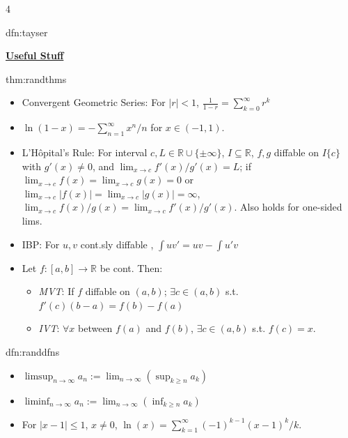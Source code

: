 \documentclass[landscape, 8pt]{extarticle}
\begin{document}
\begin{multicols*}{4}
\begin{dfn}{dfn:tayser}{ }
		\end{dfn}
		
		
		
	\columnbreak
	\vspace*{-8pt}
		
		
		{\footnotesize \textbf{\underline{Useful Stuff}}}
		
		
		
		\begin{thm}{thm:randthms}{ }
		\begin{itemize}
			\item Convergent Geometric Series: For $\left|r\right| < 1$, $\frac{1}{1-r} = \sum_{k=0}^{\infty}r^k$
			\item $\ln(1-x) = - \sum_{n=1}^{\infty} x^n/n$ for $x\in (-1, 1)$.
			\item L'H\^opital's Rule: For interval $c, L\in \mathbb{R} \cup \{\pm \infty\}$, $I \subseteq \mathbb{R}$, $f, g$ diffable on $I\{c\}$ with $g'(x) \ne 0$, and $\lim_{x\to c} f'(x)/g'(x) = L$; if $\lim_{x\to c}f(x) = \lim_{x\to c} g(x) = 0$ or $\lim_{x\to c}\left|f(x)\right| = \lim_{x\to c} \left|g(x)\right| = \infty$, $\lim_{x\to c} f(x)/g(x) = \lim_{x\to c} f'(x)/g'(x)$. Also holds for one-sided lims.
			\item IBP: For $u, v$ cont.sly diffable , $\int uv' = uv - \int u'v$
			\item Let $f: [a, b] \to \mathbb{R}$ be cont. Then:
			\begin{itemize}
				\item \textit{MVT}: If $f$ diffable on $(a, b)$; $\exists c\in (a, b)$ s.t. $f'(c) (b-a) = f(b)-f(a)$
				\item \textit{IVT}: $\forall x$ between $f(a)$ and $f(b)$, $\exists c\in (a, b)$ s.t. $f(c) = x$.
			\end{itemize}
		\end{itemize}
		
		\end{thm}
		
		
		\begin{dfn}{dfn:randdfns}{ }
		\begin{itemize}
			\item $\limsup_{n\to \infty}a_n := \lim_{n\to \infty}(\sup_{k \ge n}a_k)$
			\item $\liminf_{n\to \infty}a_n := \lim_{n\to \infty}(\inf_{k \ge n}a_k)$
			\item For $\left|x-1\right| \le 1$, $x \ne 0$, $\ln(x) = \sum_{k=1}^{\infty} (-1)^{k-1}(x-1)^k/k$.
		\end{itemize}
		

\end{dfn}
\end{multicols*}
\end{document}

